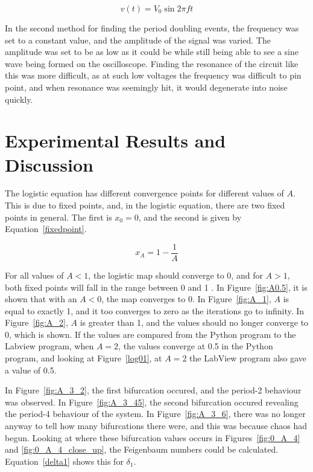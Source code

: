\documentclass[12pt]{report}
\theoremstyle{definition}
\begin{document}
\begin{equation}
v(t)=V_0\sin{2\pi ft}
\label{functiongenerator}
\end{equation}

In the second method for finding the period doubling events, the frequency was set to a constant value, and the amplitude of the signal was varied. The amplitude was set to be as low as it could be while still being able to see a sine wave being formed on the oscilloscope. Finding the resonance of the circuit like this was more difficult, as at such low voltages the frequency was difficult to pin point, and when resonance was seemingly hit, it would degenerate into noise quickly. 


%
%

\section*{Experimental Results and Discussion}

The logistic equation has different convergence points for different values of $A$. This is due to fixed points, and, in the logistic equation, there are two fixed points in general. The first is $x_0=0$, and the second is given by Equation~\ref{fixedpoint}. 

\begin{equation}
x_A=1-\frac{1}{A}
\label{fixedpoint}
\end{equation}

For all values of $A<1$, the logistic map should converge to 0, and for $A>1$, both fixed points will fall in the range between 0 and 1 \cite{hilborn}. In Figure~\ref{fig:A0.5}, it is shown that with an $A<0$, the map converges to 0. In Figure~\ref{fig:A_1}, $A$ is equal to exactly 1, and it too converges to zero as the iterations go to infinity. In Figure~\ref{fig:A_2}, $A$ is greater than 1, and the values should no longer converge to 0, which is shown. If the values are compared from the Python program to the Labview program, when $A=2$, the values converge at 0.5 in the Python program, and looking at Figure~\ref{log01}, at $A=2$ the LabView program also gave a value of 0.5.

 In Figure~\ref{fig:A_3_2}, the first bifurcation occured, and the period-2 behaviour was observed. In Figure~\ref{fig:A_3_45}, the second bifurcation occured revealing the period-4 behaviour of the system. In Figure~\ref{fig:A_3_6}, there was no longer anyway to tell how many bifurcations there were, and this was because chaos had begun. Looking at where these bifurcation values occurs in Figures~\ref{fig:0_A_4} and \ref{fig:0_A_4_close_up}, the Feigenbaum numbers could be calculated. Equation~\ref{delta1} shows this for $\delta_1$.
\end{document}

